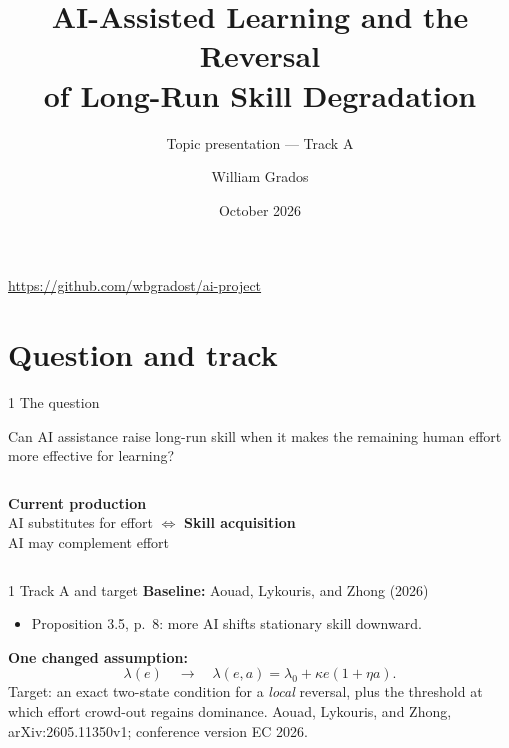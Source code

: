 \documentclass[aspectratio=169,11pt]{beamer}
\title{AI-Assisted Learning and the Reversal\\of Long-Run Skill Degradation}
\subtitle{Topic presentation --- Track A}
\author{William Grados}
\date{October 2026}
\newcommand{\source}[1]{\vfill{\tiny\color{black!60}#1}}
\begin{document}
\begin{frame}[plain]
  \titlepage
  \begin{center}\small
    \url{https://github.com/wbgradost/ai-project}
  \end{center}
\end{frame}

\section{Question and track}

\begin{frame}{1 \textperiodcentered{} The question}
  \begin{center}
    \Large Can AI assistance raise long-run skill when it makes the
    \alert{remaining human effort more effective for learning}?
  \end{center}
  \vspace{1em}
  \begin{columns}[T]
      \centering
      \textbf{Current production}\\[0.3em]
      AI substitutes for effort
      \centering\Large $\Longleftrightarrow$
      \centering
      \textbf{Skill acquisition}\\[0.3em]
      AI may complement effort
  \end{columns}
\end{frame}

\begin{frame}{1 \textperiodcentered{} Track A and target}
  \textbf{Baseline:} Aouad, Lykouris, and Zhong (2026)
  \begin{itemize}
    \item Proposition 3.5, p.~8: more AI shifts stationary skill downward.
  \end{itemize}
  \vspace{0.6em}
  \textbf{One changed assumption:}
  \[
    \lambda(e) \quad\longrightarrow\quad
    \lambda(e,a)=\lambda_0+\kappa e(1+\eta a).
  \]
  \vspace{0.3em}
  \alert{Target:} an exact two-state condition for a \emph{local} reversal,
  plus the threshold at which effort crowd-out regains dominance.
  \source{Aouad, Lykouris, and Zhong, arXiv:2605.11350v1; conference version EC 2026.}
\end{frame}

\end{document}
